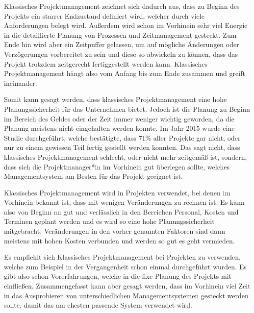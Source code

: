 

Klassisches Projektmanagement zeichnet sich dadurch aus, dass zu Beginn des Projekts ein starrer Endzustand definiert wird, welcher durch viele Anforderungen belegt wird. Außerdem wird schon im Vorhinein sehr viel Energie in die detaillierte Planung von Prozessen und Zeitmanagement gesteckt. Zum Ende hin wird aber ein Zeitpuffer gelassen, um auf mögliche Änderungen oder Verzögerungen vorbereitet zu sein und diese so abwickeln zu können, dass das Projekt trotzdem zeitgerecht fertiggestellt werden kann. Klassisches Projektmanagement hängt also vom Anfang bis zum Ende zusammen und greift ineinander. \cite{Projectman.}

Somit kann gesagt werden, dass klassisches Projektmanagement eine hohe Planungssicherheit für das Unternehmen bietet. Jedoch ist die Planung zu Beginn im Bereich des Geldes oder der Zeit immer weniger wichtig geworden, da die Planung meistens nicht eingehalten werden konnte. Im Jahr 2015 wurde eine Studie durchgeführt, welche bestätigte, dass 71\% aller Projekte gar nicht, oder nur zu einem gewissen Teil fertig gestellt werden konnten. Das sagt nicht, dass klassisches Projektmanagement schlecht, oder nicht mehr zeitgemäß ist, sondern, dass sich die Projektmanager*in im Vorhinein gut überlegen sollte, welches Managementsystem am Besten für das Projekt geeignet ist.  \cite{Projectman.}


Klassisches Projektmanagement wird in Projekten verwendet, bei denen im Vorhinein bekannt ist, dass mit wenigen Veränderungen zu rechnen ist. Es kann also von Beginn an gut und verlässlich in den Bereichen Personal, Kosten und Terminen geplant werden und es wird so eine hohe Planungssicherheit mitgebracht. Veränderungen in den vorher genannten Faktoren sind dann meistens mit hohen Kosten verbunden und werden so gut es geht vermieden. \cite{Projectman.}

Es empfiehlt sich Klassisches Projektmanagement bei Projekten zu verwenden, welche zum Beispiel in der Vergangenheit schon einmal durchgeführt wurden. Es gibt also schon Vorerfahrungen, welche in die fixe Planung des Projekts mit einfließen. Zusammengefasst kann aber gesagt werden, dass im Vorhinein viel Zeit in das Ausprobieren von unterschiedlichen Managementsystemen gesteckt werden sollte, damit das am ehesten passende System verwendet wird. \cite{Projectman.}

